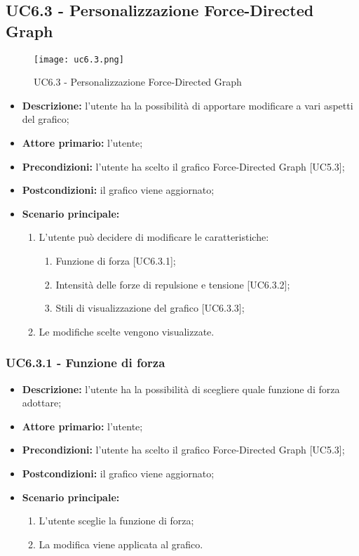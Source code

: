 \subsection{UC6.3 - Personalizzazione Force-Directed Graph}
\begin{figure}[H]
  \centering
  \texttt{[image: uc6.3.png]}
  \caption{UC6.3 - Personalizzazione Force-Directed Graph}
\end{figure}
\begin{itemize}
    \item \textbf{Descrizione:} l'utente ha la possibilità di apportare modificare a vari aspetti del grafico;
    \item \textbf{Attore primario:} l'utente;
    \item \textbf{Precondizioni:} l’utente ha scelto il grafico Force-Directed Graph [UC5.3];
    \item \textbf{Postcondizioni:} il grafico viene aggiornato;
    \item \textbf{Scenario principale:} 
    \begin{enumerate}
      \item L'utente può decidere di modificare le caratteristiche:
    \begin{enumerate}
      \item Funzione di forza [UC6.3.1];
      \item Intensità delle forze di repulsione e tensione [UC6.3.2];
      \item Stili di visualizzazione del grafico [UC6.3.3];
    \end{enumerate}
    \item Le modifiche scelte vengono visualizzate.
  \end{enumerate}
  \end{itemize}

  \subsubsection{UC6.3.1 - Funzione di forza}
  \begin{itemize}
    \item \textbf{Descrizione:} l'utente ha la possibilità di scegliere quale funzione di forza adottare;
    \item \textbf{Attore primario:} l'utente;
    \item \textbf{Precondizioni:} l’utente ha scelto il grafico Force-Directed Graph [UC5.3];
    \item \textbf{Postcondizioni:} il grafico viene aggiornato;
    \item \textbf{Scenario principale:} 
     \begin{enumerate}
      \item L'utente sceglie la funzione di forza;
      \item La modifica viene applicata al grafico.
    \end{enumerate}
  \end{itemize}

